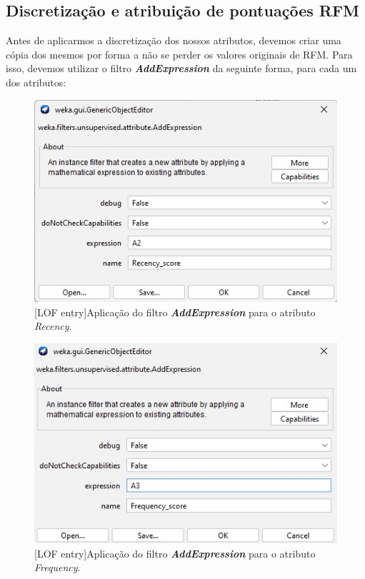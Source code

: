 \documentclass{easychair}
\begin{document}
\newpage
\subsection{Discretização e atribuição de pontuações RFM}

Antes de aplicarmos a discretização dos nossos atributos, devemos criar uma cópia dos mesmos por forma a não se perder os valores originais de RFM. Para isso, devemos utilizar o filtro \textit{\textbf{AddExpression}} da seguinte forma, para cada um dos atributos:

 \begin{figure}[H]
    \begin{centering}
    \includegraphics[width=0.5\linewidth]{imagens/figure12.jpg}\label{cap-3-fig12}
    [LOF entry]{Aplicação do filtro \textit{\textbf{AddExpression}} para o atributo \textit{Recency}.}
    \label{fig12}
    \end{centering}
\end{figure}

 \begin{figure}[H]
    \begin{centering}
    \includegraphics[width=0.5\linewidth]{imagens/figure13.jpg}\label{cap-3-fig13}
    [LOF entry]{Aplicação do filtro \textit{\textbf{AddExpression}} para o atributo \textit{Frequency}.}
    \label{fig13}
    \end{centering}
\end{figure}
\end{document}
